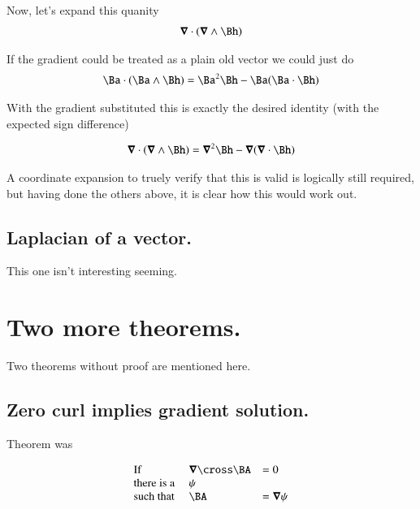 \documentclass{article}
\begin{document}
Now, let's expand this quanity
\begin{align*}
\spacegrad \cdot (\spacegrad \wedge \Bh)
\end{align*}

If the gradient could be treated as a plain old vector we could just do
\begin{align*}
\Ba \cdot (\Ba \wedge \Bh) &= \Ba^2 \Bh - \Ba(\Ba \cdot \Bh) \\
\end{align*}

With the gradient substituted this is exactly the desired identity (with the expected sign difference)

\begin{align*}
\spacegrad \cdot (\spacegrad \wedge \Bh) &= \spacegrad^2 \Bh - \spacegrad(\spacegrad \cdot \Bh) \\
\end{align*}

A coordinate expansion to truely verify that this is valid is logically still required, but having done the others above, it is clear how this
would work out.

\subsection{ Laplacian of a vector. }

This one isn't interesting seeming.

\section{ Two more theorems. }

Two theorems without proof are mentioned here.

\subsection{ Zero curl implies gradient solution. }

Theorem was

\begin{equation*}
\begin{array}{l l l}
\text{If} &          \spacegrad \cross \BA &= 0 \\
\text{there is a } &                  \psi &    \\
\text{such that  } & \BA &= \spacegrad \psi \\
\end{array} 
\end{equation*}
\end{document}
